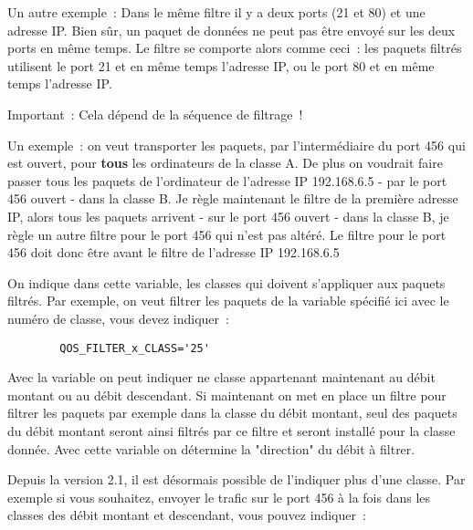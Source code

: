 \begin{description}
    Un autre exemple~: Dans le même filtre il y a deux ports (21 et 80) et
    une adresse IP. Bien sûr, un paquet de données ne peut pas être envoyé
    sur les deux ports en même temps. Le filtre se comporte alors comme
    ceci~: les paquets filtrés utilisent le port 21 et en même temps l'adresse
    IP, ou le port 80 et en même temps l'adresse IP.

    Important~: Cela dépend de la séquence de filtrage~!

    Un exemple~: on veut transporter les paquets, par l'intermédiaire du
    port 456 qui est ouvert, pour \textbf{tous} les ordinateurs de la classe A.
    De plus on voudrait faire passer tous les paquets de l'ordinateur de
    l'adresse IP 192.168.6.5 - par le port 456 ouvert - dans la classe B.
    Je règle maintenant le filtre de la première adresse IP, alors tous
    les paquets arrivent - sur le port 456 ouvert - dans la classe B, je
    règle un autre filtre pour le port 456 qui n'est pas altéré. Le filtre
    pour le port 456 doit donc être avant le filtre de l'adresse IP 192.168.6.5


    On indique dans cette variable, les classes qui doivent s'appliquer
    aux paquets filtrés. Par exemple, on veut filtrer les paquets de la
    variable spécifié ici  avec
    le numéro de classe, vous devez indiquer~:

\begin{example}
\begin{verbatim}
        QOS_FILTER_x_CLASS='25'
\end{verbatim}
\end{example}

    Avec la variable  on peut indiquer
    ne classe appartenant maintenant au débit montant ou au débit descendant.
    Si maintenant on met en place un filtre pour filtrer les paquets par
    exemple dans la classe du débit montant, seul des paquets du débit montant
    seront ainsi filtrés par ce filtre et seront installé pour la classe
    donnée. Avec cette variable  on
    détermine la "direction" du débit à filtrer.

    Depuis la version 2.1, il est désormais possible de l'indiquer plus
    d'une classe. Par exemple si vous souhaitez, envoyer le trafic sur le
    port 456 à la fois dans les classes des débit montant et descendant,
    vous pouvez indiquer~:


\end{description}
